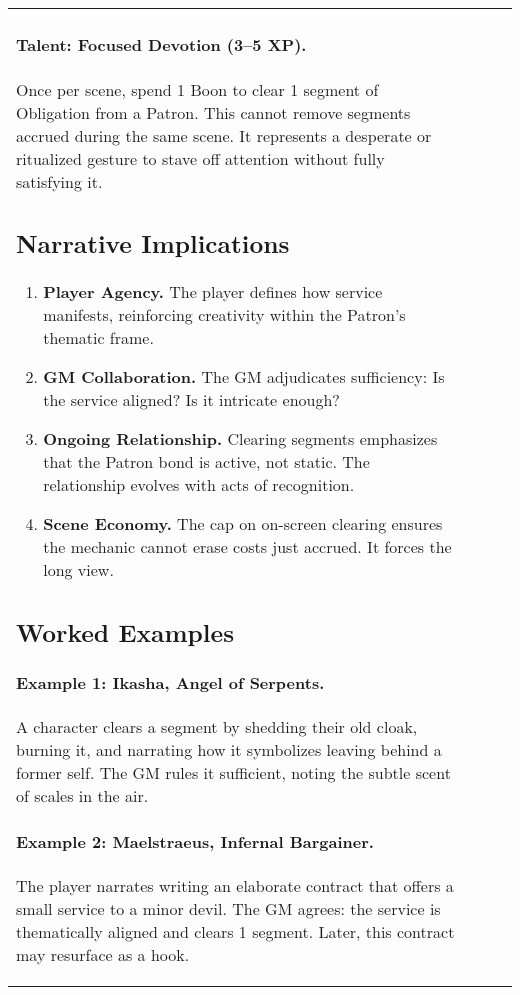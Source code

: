 \begin{longtable}{@{}p{3.3cm}p{3.3cm}p{4.6cm}p{7.2cm}@{}}
\paragraph{Talent: Focused Devotion (3–5 XP).}\index{Focused Devotion} Once per scene, spend 1 Boon to clear 1 segment of Obligation from a Patron. This cannot remove segments accrued during the same scene. It represents a desperate or ritualized gesture to stave off attention without fully satisfying it.

\subsection{Narrative Implications}\label{subsec:obligation-implications}
\begin{enumerate}
\item \textbf{Player Agency.} The player defines how service manifests, reinforcing creativity within the Patron’s thematic frame.
\item \textbf{GM Collaboration.} The GM adjudicates sufficiency: Is the service aligned? Is it intricate enough?\index{GM Guidance}
\item \textbf{Ongoing Relationship.} Clearing segments emphasizes that the Patron bond is active, not static. The relationship evolves with acts of recognition.
\item \textbf{Scene Economy.} The cap on on-screen clearing ensures the mechanic cannot erase costs just accrued. It forces the long view.
\end{enumerate}

\subsection{Worked Examples}\label{subsec:obligation-examples}
\paragraph{Example 1: Ikasha, Angel of Serpents.} A character clears a segment by shedding their old cloak, burning it, and narrating how it symbolizes leaving behind a former self. The GM rules it sufficient, noting the subtle scent of scales in the air.

\paragraph{Example 2: Maelstraeus, Infernal Bargainer.} The player narrates writing an elaborate contract that offers a small service to a minor devil. The GM agrees: the service is thematically aligned and clears 1 segment. Later, this contract may resurface as a hook.


\end{longtable}
